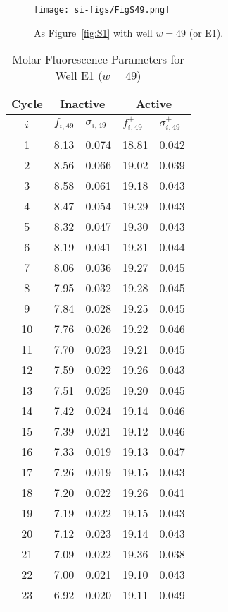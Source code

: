                 \begin{figure}
                    \centering
                    \texttt{[image: si-figs/FigS49.png]}
                    \caption{
                        As Figure~\ref{fig:S1} with well $w=49$ (or E1).
                    }
                \end{figure}
                \clearpage
    \begin{table}
        \caption{Molar Fluorescence Parameters for Well E1 ($w=49$)}
        \centering
        \begin{tabular}{c|ll|ll}
            Cycle & \multicolumn{2}{c|}{Inactive} & \multicolumn{2}{c}{Active} \\
            \hline
            $i$ & $f_{i,49}^{-}$ & $\sigma_{i,49}^{-}$ &  $f_{i,49}^{+}$ & $\sigma_{i,49}^{+}$ \\
            \hline
    1 & 8.13 & 0.074 & 18.81 & 0.042 \\
2 & 8.56 & 0.066 & 19.02 & 0.039 \\
3 & 8.58 & 0.061 & 19.18 & 0.043 \\
4 & 8.47 & 0.054 & 19.29 & 0.043 \\
5 & 8.32 & 0.047 & 19.30 & 0.043 \\
6 & 8.19 & 0.041 & 19.31 & 0.044 \\
7 & 8.06 & 0.036 & 19.27 & 0.045 \\
8 & 7.95 & 0.032 & 19.28 & 0.045 \\
9 & 7.84 & 0.028 & 19.25 & 0.045 \\
10 & 7.76 & 0.026 & 19.22 & 0.046 \\
11 & 7.70 & 0.023 & 19.21 & 0.045 \\
12 & 7.59 & 0.022 & 19.26 & 0.043 \\
13 & 7.51 & 0.025 & 19.20 & 0.045 \\
14 & 7.42 & 0.024 & 19.14 & 0.046 \\
15 & 7.39 & 0.021 & 19.12 & 0.046 \\
16 & 7.33 & 0.019 & 19.13 & 0.047 \\
17 & 7.26 & 0.019 & 19.15 & 0.043 \\
18 & 7.20 & 0.022 & 19.26 & 0.041 \\
19 & 7.19 & 0.022 & 19.15 & 0.043 \\
20 & 7.12 & 0.023 & 19.14 & 0.043 \\
21 & 7.09 & 0.022 & 19.36 & 0.038 \\
22 & 7.00 & 0.021 & 19.10 & 0.043 \\
23 & 6.92 & 0.020 & 19.11 & 0.049 \\

\end{tabular}
\end{table}
